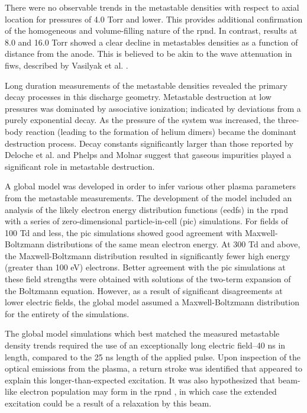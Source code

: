 There were no observable trends in the metastable densities with respect to
axial location for pressures of 4.0 Torr and lower. This provides additional
confirmation of the homogeneous and volume-filling nature of the \acs{rpnd}. In
contrast, results at 8.0 and 16.0 Torr showed a clear decline in metastables
densities as a function of distance from the anode. This is believed to be akin
to the wave attenuation in \acs{fiw}s, described by Vasilyak et al.
\cite{Vasilyak1994}.

Long duration measurements of the metastable densities revealed the primary
decay processes in this discharge geometry. Metastable destruction at low
pressures was dominated by associative ionization; indicated by deviations from
a purely exponential decay. As the pressure of the system was increased, the
three-body reaction (leading to the formation of helium dimers) became the
dominant destruction process. Decay constants significantly larger than
those reported by Deloche et al. \cite{Deloche1976} and Phelps and Molnar
\cite{Phelps1953} suggest that gaseous impurities played a significant role in
metastable destruction.

A global model was developed in order to infer various other plasma parameters
from the metastable measurements. The development of the model included an
analysis of the likely electron energy distribution functions (\acs{eedf}s) in
the \acs{rpnd} with a series of zero-dimensional particle-in-cell (\acs{pic})
simulations. For fields of 100 Td and less, the \acs{pic} simulations showed
good agreement with Maxwell-Boltzmann distributions of the same mean electron
energy. At 300 Td and above, the Maxwell-Boltzmann distribution resulted in
significantly fewer high energy (greater than 100 eV) electrons. Better
agreement with the \acs{pic} simulations at these field strengths were obtained
with solutions of the two-term expansion of the Boltzmann equation. However, as
a result of significant disagreements at lower electric fields, the global model
assumed a Maxwell-Boltzmann distribution for the entirety of the simulations.

The global model simulations which best matched the measured metastable density
trends required the use of an exceptionally long electric field--40 ns in
length, compared to the 25 ns length of the applied pulse. Upon inspection of
the optical emissions from the plasma, a return stroke was identified that
appeared to explain this longer-than-expected excitation. It was also
hypothesized that beam-like electron population may form in the \acs{rpnd}
\cite{Starikovskaia1998}, in which case the extended excitation could be a
result of a relaxation by this beam.

